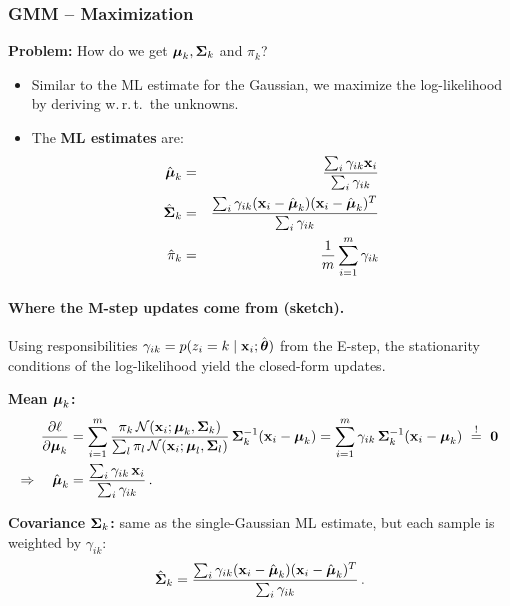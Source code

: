  \subsubsection{GMM -- Maximization}
  
    \textbf{Problem:} How do we get $\bm{\mathrm{\mu}}_k, \mathbf{\Sigma}_k$ and $\pi_k$?  

  \begin{itemize}
    \item Similar to the ML estimate for the Gaussian, we maximize the log-likelihood by deriving w.\,r.\,t.\ the unknowns.     
    \item The   \textbf{ML estimates} are:
      \begin{eqnarray*}
        \hat{\bm{\mathrm{\mu}}}_k 
          &=& \frac{\sum_i \gamma_{ik} \bm{\mathrm{x}}_i}{\sum_i \gamma_{ik}} \\
        \hat{\mathbf{\Sigma}}_k 
          &=& \frac{\sum_i \gamma_{ik} (\bm{\mathrm{x}}_i - \hat{\bm{\mathrm{\mu}}}_k)(\bm{\mathrm{x}}_i - \hat{\bm{\mathrm{\mu}}}_k)^T}{\sum_i \gamma_{ik}} \\
        \hat{\pi}_k 
          &=& \frac{1}{m} \sum_{i=1}^m \gamma_{ik}
      \end{eqnarray*}
  \end{itemize}

  \paragraph{Where the M-step updates come from (sketch).}
  Using responsibilities $\gamma_{ik}=p(z_i=k\mid\bm{\mathrm{x}}_i;\hat{\bm{\mathrm{\theta}}})$ from the E-step, the stationarity conditions of the log-likelihood yield the closed-form updates.

  \textbf{Mean $\bm{\mathrm{\mu}}_k$:}
  {\small
  \begin{align*}
    \frac{\partial \ell}{\partial \bm{\mathrm{\mu}}_k}
      &= \sum_{i=1}^m
          \frac{\pi_k\,\mathcal N(\bm{\mathrm{x}}_i;\bm{\mathrm{\mu}}_k,\mathbf{\Sigma}_k)}{\sum_{l} \pi_l\,\mathcal N(\bm{\mathrm{x}}_i;\bm{\mathrm{\mu}}_l,\mathbf{\Sigma}_l)}\,\mathbf{\Sigma}_k^{-1}(\bm{\mathrm{x}}_i-\bm{\mathrm{\mu}}_k)
       = \sum_{i=1}^m \gamma_{ik}\,\mathbf{\Sigma}_k^{-1}(\bm{\mathrm{x}}_i-\bm{\mathrm{\mu}}_k)
       ~\stackrel{!}{=}~ \bm{\mathrm{0}}\\
    \Rightarrow\quad \hat{\bm{\mathrm{\mu}}}_k &= \frac{\sum_i \gamma_{ik}\,\bm{\mathrm{x}}_i}{\sum_i \gamma_{ik}}\,.
  \end{align*}
  }

  \textbf{Covariance $\mathbf{\Sigma}_k$:} same as the single-Gaussian ML estimate, but each sample is weighted by $\gamma_{ik}$:
  {\small
  \[
    \hat{\mathbf{\Sigma}}_k = \frac{\sum_i \gamma_{ik}(\bm{\mathrm{x}}_i-\hat{\bm{\mathrm{\mu}}}_k)(\bm{\mathrm{x}}_i-\hat{\bm{\mathrm{\mu}}}_k)^{T}}{\sum_i \gamma_{ik}}\,.
  \]
  }

